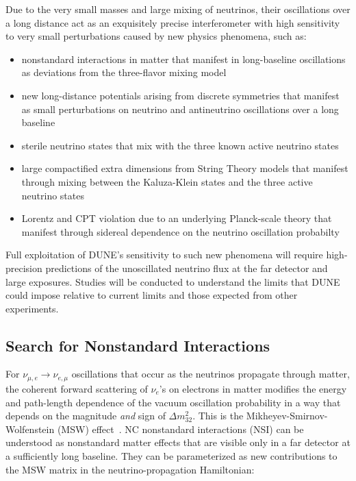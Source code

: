 Due to the very small masses and large mixing of neutrinos, their oscillations over a long distance
  act as an exquisitely precise interferometer with high sensitivity to very small perturbations caused by 
  new physics phenomena, such as:
  \begin{itemize}
  \item nonstandard interactions in matter that manifest in
    long-baseline oscillations as deviations from the three-flavor mixing model
  \item new long-distance potentials arising from discrete symmetries
    that manifest as small perturbations on neutrino and antineutrino
    oscillations over a long baseline
  \item sterile neutrino states that mix with the three known active neutrino states
  \item large compactified extra dimensions from String Theory models that manifest through mixing
    between the Kaluza-Klein states and the three active neutrino
    states
   \item Lorentz and CPT violation due to an underlying Planck-scale theory that manifest through sidereal dependence on the neutrino oscillation probabilty
  \end{itemize}
  Full exploitation of DUNE's sensitivity to such new phenomena
  will require high-precision predictions of the unoscillated
  neutrino flux at the far detector and large exposures. Studies will be conducted to understand the
limits that DUNE could impose relative to current limits and those expected from other experiments.
  
\subsection{Search for Nonstandard Interactions}

For $\nu_{\mu,e} \rightarrow \nu_{e,\mu}$ 
oscillations that occur as the neutrinos propagate through matter,  
the coherent forward scattering of $\nu_e$'s on electrons in matter 
modifies the energy and path-length dependence of the vacuum oscillation 
probability in a way that depends on the magnitude \emph{and} sign of $\Delta m^2_{32}$. 
This is  the Mikheyev-Smirnov-Wolfenstein (MSW) effect~\cite{Mikheev:1986gs,Wolfenstein:1977ue}.
NC nonstandard interactions (NSI) can be understood as nonstandard
matter effects that are visible only in a far detector at a
sufficiently long baseline. 
They can be parameterized as new contributions
to the MSW matrix in the neutrino-propagation Hamiltonian:

